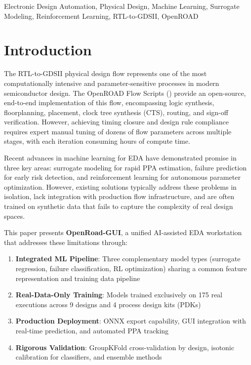 \documentclass[10pt,conference]{IEEEtran}
\newcommand{\ORFS}{\text{ORFS}}
\begin{document}
\begin{IEEEkeywords}
Electronic Design Automation, Physical Design, Machine Learning, Surrogate Modeling, Reinforcement Learning, RTL-to-GDSII, OpenROAD
\end{IEEEkeywords}


\section{Introduction}
\label{sec:introduction}

The RTL-to-GDSII physical design flow represents one of the most computationally intensive and parameter-sensitive processes in modern semiconductor design. The OpenROAD Flow Scripts (\ORFS{}) provide an open-source, end-to-end implementation of this flow, encompassing logic synthesis, floorplanning, placement, clock tree synthesis (CTS), routing, and sign-off verification. However, achieving timing closure and design rule compliance requires expert manual tuning of dozens of flow parameters across multiple stages, with each iteration consuming hours of compute time.

Recent advances in machine learning for EDA have demonstrated promise in three key areas: surrogate modeling for rapid PPA estimation, failure prediction for early risk detection, and reinforcement learning for autonomous parameter optimization. However, existing solutions typically address these problems in isolation, lack integration with production flow infrastructure, and are often trained on synthetic data that fails to capture the complexity of real design spaces.

This paper presents \textbf{OpenRoad-GUI}, a unified AI-assisted EDA workstation that addresses these limitations through:

\begin{enumerate}
    \item \textbf{Integrated ML Pipeline}: Three complementary model types (surrogate regression, failure classification, RL optimization) sharing a common feature representation and training data pipeline
    \item \textbf{Real-Data-Only Training}: Models trained exclusively on 175 real \ORFS{} executions across 9 designs and 4 process design kits (PDKs)
    \item \textbf{Production Deployment}: ONNX export capability, GUI integration with real-time prediction, and automated PPA tracking
    \item \textbf{Rigorous Validation}: GroupKFold cross-validation by design, isotonic calibration for classifiers, and ensemble methods
\end{enumerate}
\end{document}
